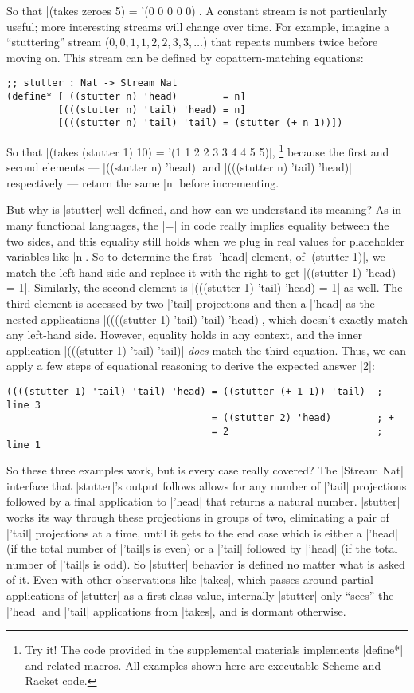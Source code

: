 So that \scm|(takes zeroes 5) = '(0 0 0 0 0)|.
A constant stream is not particularly useful; more interesting streams will change over time.
For example, imagine a ``stuttering'' stream ($0, 0, 1, 1, 2, 2, 3, 3, \dots$) that repeats numbers twice before moving on.
This stream can be defined by copattern-matching equations:
\begin{verbatim}
;; stutter : Nat -> Stream Nat
(define* [ ((stutter n) 'head)        = n]
         [(((stutter n) 'tail) 'head) = n]
         [(((stutter n) 'tail) 'tail) = (stutter (+ n 1))])
\end{verbatim}
So that \scm|(takes (stutter 1) 10) = '(1 1 2 2 3 3 4 4 5 5)|,%
\footnote{
  Try it!
  The code provided in the supplemental materials implements \scm|define*| and related macros.
  All examples shown here are executable Scheme and Racket code.
}
%
because the first and second elements --- \scm|((stutter n) 'head)| and \scm|(((stutter n) 'tail) 'head)| respectively --- return the same \scm|n| before incrementing.

But why is \scm|stutter| well-defined, and how can we understand its meaning?
As in many functional languages, the \scm|=| in code really implies equality between the two sides, and this equality still holds when we plug in real values for placeholder variables like \scm|n|.
So to determine the first \scm|'head| element, of \scm|(stutter 1)|, we match the left-hand side and replace it with the right to get \scm|((stutter 1) 'head) = 1|.
Similarly, the second element is \scm|(((stutter 1) 'tail) 'head) = 1| as well.
The third element is accessed by two \scm|'tail| projections and then a \scm|'head| as the nested applications \scm|((((stutter 1) 'tail) 'tail) 'head)|, which doesn't exactly match any left-hand side.
However, equality holds in any context, and the inner application \scm|(((stutter 1) 'tail) 'tail)| \emph{does} match the third equation.
Thus, we can apply a few steps of equational reasoning to derive the expected answer \scm|2|:
\begin{verbatim}
((((stutter 1) 'tail) 'tail) 'head) = ((stutter (+ 1 1)) 'tail)  ; line 3
                                    = ((stutter 2) 'head)        ; +
                                    = 2                          ; line 1
\end{verbatim}
So these three examples work, but is every case really covered?
The \scm|Stream Nat| interface that \scm|stutter|'s output follows allows for any number of \scm|'tail| projections followed by a final application to \scm|'head| that returns a natural number.
\scm|stutter| works its way through these projections in groups of two, eliminating a pair of \scm|'tail| projections at a time, until it gets to the end case which is either a \scm|'head| (if the total number of \scm|'tail|s is even) or a \scm|'tail| followed by \scm|'head| (if the total number of \scm|'tail|s is odd).
So \scm|stutter| behavior is defined no matter what is asked of it.
Even with other observations like \scm|takes|, which passes around partial applications of \scm|stutter| as a first-class value, internally \scm|stutter| only ``sees'' the \scm|'head| and \scm|'tail| applications from \scm|takes|, and is dormant otherwise.

